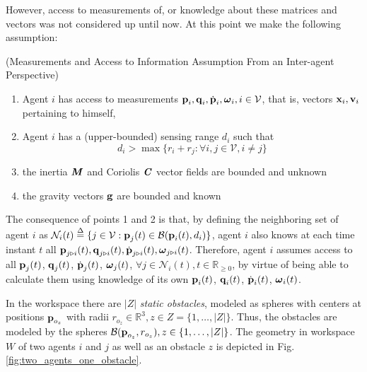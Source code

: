 However, access to measurements of, or knowledge about these matrices and
vectors was not considered up until now. At this point we make the following
assumption:

\begin{gg_box}
\begin{assumption} (Measurements and Access to Information Assumption From an
  Inter-agent Perspective)
  \begin{enumerate}

    \item Agent $i$ has access to measurements
      $\bm{\mathbf{p}}_i, \bm{\mathbf{q}}_i, \dot{\bm{\mathbf{p}}}_i, \bm{\mathbf{\omega}}_i, i\in\mathcal{V}$,
      that is, vectors $\bm{\mathbf{x}}_i, \bm{\mathbf{v}}_i$ pertaining to himself,

    \item Agent $i$ has a (upper-bounded) sensing range $d_i$ such that
      $$d_i > \max\{r_i + r_j : \forall i,j \in \mathcal{V}, i \neq j\}$$

    \item the inertia $\bm{\mathit{M}}$ and Coriolis $\bm{\mathit{C}}$ vector fields are
      bounded and unknown

    \item the gravity vectors $\bm{\mathbf{g}}$ are bounded and known

  \end{enumerate}
  \label{ass:measurements_access}
\end{assumption}
\end{gg_box}

The consequence of points 1 and 2 is that, by defining the neighboring set of
agent $i$ as
$\mathcal{N}_i(t) \overset{\Delta}{=} \{j\in\mathcal{V} : \bm{\mathbf{p}}_j(t)\in\mathcal{B}(\bm{\mathbf{p}}_i(t), d_i)\}$,
agent $i$ also knows at each time instant $t$ all
$\bm{\mathbf{p}}_{j \triangleright i}(t), \bm{\mathbf{q}}_{j \triangleright i}(t),
\dot{\bm{\mathbf{p}}}_{j \triangleright i}(t), \bm{\mathbf{\omega}}_{j \triangleright i}(t)$.
Therefore, agent $i$ assumes access to all
$\bm{\mathbf{p}}_{j}(t)$, $\bm{\mathbf{q}}_{j}(t)$, $\dot{\bm{\mathbf{p}}}_j(t)$,
$\bm{\mathbf{\omega}}_j(t)$, $\forall j\in \mathcal{N}_i(t),t\in\mathbb{R}_{\geq 0}$,
by virtue of being able to calculate them using knowledge of its own
$\bm{\mathbf{p}}_i(t)$, $\bm{\mathbf{q}}_i(t)$, $\dot{\bm{\mathbf{p}}}_i(t)$, $\bm{\mathbf{\omega}}_i(t)$.



In the workspace there are $|Z|$ \textit{static obstacles}, modeled as
spheres with centers at positions $\bm{\mathbf{p}}_{o_z}$ with radii
$r_{o_z}\in \mathbb{R}^3, z \in Z = \{1,\dots,|Z| \}$.
Thus, the obstacles are modeled by the spheres
$\mathcal{B}(\bm{\mathbf{p}}_{o_z}, r_{o_z}), z \in \{1,\dots,|Z|\}$. The geometry in
workspace $W$ of two agents $i$ and $j$ as well as an obstacle $z$ is depicted
in Fig. \ref{fig:two_agents_one_obstacle}.

